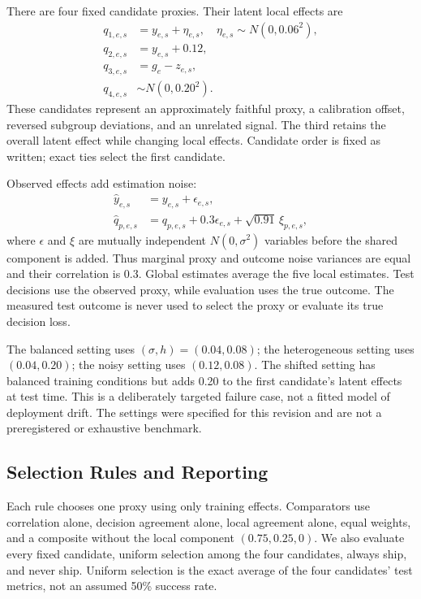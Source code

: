 \documentclass{ieeeaccess}
\begin{document}
There are four fixed candidate proxies. Their latent local effects are
\begin{align}
 q_{1,e,s}&=y_{e,s}+\eta_{e,s},\quad \eta_{e,s}\sim N(0,0.06^2),\\
 q_{2,e,s}&=y_{e,s}+0.12,\\
 q_{3,e,s}&=g_e-z_{e,s},\\
 q_{4,e,s}&\sim N(0,0.20^2).
\end{align}
These candidates represent an approximately faithful proxy, a calibration offset, reversed subgroup deviations, and an unrelated signal. The third retains the overall latent effect while changing local effects. Candidate order is fixed as written; exact ties select the first candidate.

Observed effects add estimation noise:
\begin{align}
 \widehat y_{e,s}&=y_{e,s}+\epsilon_{e,s},\\
 \widehat q_{p,e,s}&=q_{p,e,s}+0.3\epsilon_{e,s}
                  +\sqrt{0.91}\,\xi_{p,e,s},
\end{align}
where $\epsilon$ and $\xi$ are mutually independent $N(0,\sigma^2)$ variables before the shared component is added. Thus marginal proxy and outcome noise variances are equal and their correlation is 0.3. Global estimates average the five local estimates. Test decisions use the observed proxy, while evaluation uses the true outcome. The measured test outcome is never used to select the proxy or evaluate its true decision loss.

The balanced setting uses $(\sigma,h)=(0.04,0.08)$; the heterogeneous setting uses $(0.04,0.20)$; the noisy setting uses $(0.12,0.08)$. The shifted setting has balanced training conditions but adds 0.20 to the first candidate's latent effects at test time. This is a deliberately targeted failure case, not a fitted model of deployment drift. The settings were specified for this revision and are not a preregistered or exhaustive benchmark.

\subsection{Selection Rules and Reporting}
Each rule chooses one proxy using only training effects. Comparators use correlation alone, decision agreement alone, local agreement alone, equal weights, and a composite without the local component $(0.75,0.25,0)$. We also evaluate every fixed candidate, uniform selection among the four candidates, always ship, and never ship. Uniform selection is the exact average of the four candidates' test metrics, not an assumed 50\% success rate.
\end{document}
